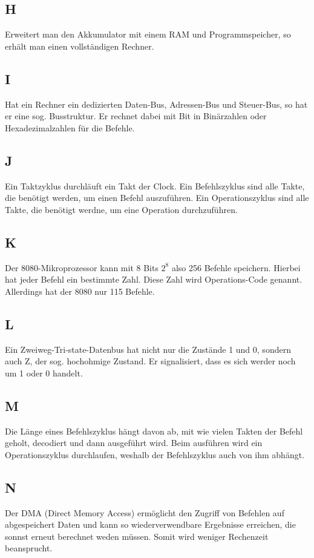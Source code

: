 \documentclass[10pt]{article}
\begin{document}
\begin{multicols}{2}
  \subsection*{H}
  Erweitert man den Akkumulator mit einem RAM und Programmspeicher, so erhält man einen vollständigen Rechner.
  \subsection*{I}
  Hat ein Rechner ein dedizierten Daten-Bus, Adressen-Bus und Steuer-Bus, so hat er eine sog. Busstruktur. Er rechnet dabei mit Bit in Binärzahlen oder Hexadezimalzahlen für die Befehle.
  \subsection*{J}
  Ein Taktzyklus durchläuft ein Takt der Clock. Ein Befehlszyklus sind alle Takte, die benötigt werden, um einen Befehl auszuführen. Ein Operationszyklus sind alle Takte, die benötigt werdne, um eine Operation durchzuführen.
  \subsection*{K}
  Der 8080-Mikroprozessor kann mit 8 Bits $2^8$ also 256 Befehle speichern. Hierbei hat jeder Befehl ein bestimmte Zahl. Diese Zahl wird Operations-Code genannt. Allerdings hat der 8080 nur 115 Befehle.
  \subsection*{L}
  Ein Zweiweg-Tri-state-Datenbus hat nicht nur die Zustände 1 und 0, sondern auch Z, der sog. hochohmige Zustand. Er signalisiert, dass es sich werder noch um 1 oder 0 handelt.
  \subsection*{M}
  Die Länge eines Befehlszyklus hängt davon ab, mit wie vielen Takten der Befehl geholt, decodiert und dann ausgeführt wird. Beim ausführen wird ein Operationszyklus durchlaufen, weshalb der Befehlszyklus auch von ihm abhängt.
  \subsection*{N}
  Der DMA (Direct Memory Access) ermöglicht den Zugriff von Befehlen auf abgespeichert Daten und kann so wiederverwendbare Ergebnisse erreichen, die sonnst erneut berechnet weden müssen. Somit wird weniger Rechenzeit beansprucht.

\end{multicols}
\end{document}
